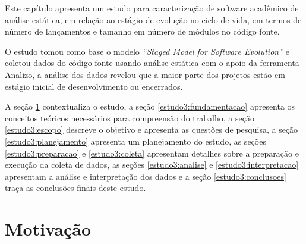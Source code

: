 \label{estudo3}



Este capítulo apresenta
um estudo para caracterização de software acadêmico de análise estática,
em relação ao estágio de evolução no ciclo de vida,
em termos de número de lançamentos e
tamanho em número de módulos no código fonte.

O estudo tomou como base o modelo {\it ``Staged Model for Software Evolution''}
e coletou dados do código fonte usando análise estática com o apoio da
ferramenta Analizo, a análise dos dados revelou que a maior parte dos projetos
estão em estágio inicial de desenvolvimento ou encerrados.


A seção \ref{estudo3:introducao} contextualiza o estudo,
a seção \ref{estudo3:fundamentacao} apresenta os conceitos teóricos necessários para compreensão do trabalho,
a seção \ref{estudo3:escopo} descreve o objetivo e apresenta as questões de pesquisa,
a seção \ref{estudo3:planejamento} apresenta um planejamento do estudo,
as seções \ref{estudo3:preparacao} e \ref{estudo3:coleta} apresentam detalhes sobre a preparação e execução da coleta de dados,
as seções \ref{estudo3:analise} e \ref{estudo3:interpretacao} apresentam a análise e interpretação dos dados e
a seção \ref{estudo3:conclusoes} traça as conclusões finais deste estudo.

\section{Motivação} \label{estudo3:introducao}

